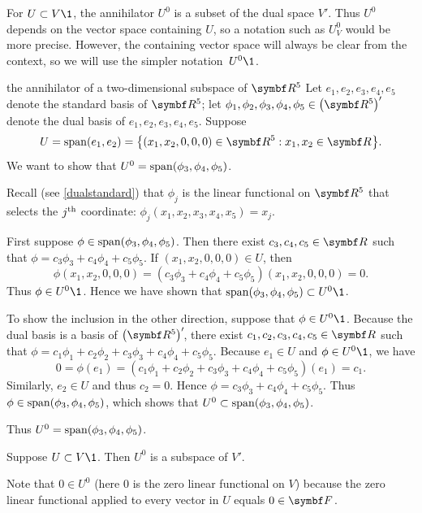 For $U \subset V\1$, the annihilator $U^0$ is a subset of the dual space $V'\!$. Thus $U^0$ depends on the vector space containing $U$, so a notation such as $U^0_V$ would be more precise. However, the containing vector space will always be clear from the context, so we will use the simpler notation~$U^0\1$.

\begin{example}[annih]{the annihilator of a two-dimensional subspace of\/ $\R5$}
Let $e_1, e_2, e_3, e_4, e_5$ denote the standard basis of $\R5$; let $\phi_1, \phi_2, \phi_3, \phi_4,\phi_5 \in {\paren[\big]{\R5}}'\!$ denote the dual basis of $e_1, e_2, e_3, e_4, e_5$. Suppose
\[
U = \Span(e_1, e_2) = \br[\big]{(x_1, x_2, 0, 0, 0) \in \R5: x_1, x_2 \in \R{}}.
\]
We want to show that $U^0 = \operatorname{span}(\phi_3, \phi_4, \phi_5)$.

Recall (see \ref{dualstandard}) that $\phi_j$ is the linear functional on $\R5$ that selects the $j^{\text{{th}}}$ coordinate: $\phi_j(x_1, x_2, x_3, x_4, x_5) = x_j$.

First suppose $\phi \in \operatorname{span}(\phi_3, \phi_4, \phi_5)$. Then there exist $c_3, c_4, c_5 \in \R{}$ such that $\phi = c_3 \phi_3 + c_4 \phi_4 + c_5 \phi_5$. If $(x_1, x_2, 0, 0, 0) \in U$, then
\[
\phi(x_1, x_2, 0, 0, 0) = (c_3 \phi_3 + c_4 \phi_4 + c_5 \phi_5)(x_1, x_2, 0, 0, 0) = 0.
\]
Thus $\phi \in U^0\1$. Hence we have shown that $\Span(\phi_3, \phi_4, \phi_5) \subset U^0\1$.

To show the inclusion in the other direction, suppose that $\phi \in U^0\1$. Because the dual basis is a basis of ${\paren[\big]{\R5}}'\!$, there exist $c_1, c_2, c_3, c_4, c_5 \in \R{}$ such that \mbox{$\phi = c_1 \phi_1 + c_2 \phi_2 + c_3 \phi_3 + c_4 \phi_4 + c_5 \phi_5$}. Because $e_1 \in U$ and $\phi \in U^0\1$, we have
\[
0 = \phi(e_1) = (c_1 \phi_1 + c_2 \phi_2 + c_3 \phi_3 + c_4 \phi_4 + c_5 \phi_5)(e_1) = c_1.
\]
Similarly, $e_2 \in U$ and thus $c_2 = 0$. Hence $\phi = c_3 \phi_3 + c_4 \phi_4 + c_5 \phi_5$. Thus $\phi \in \operatorname{span}(\phi_3, \phi_4, \phi_5)$, which shows that $U^0 \subset \operatorname{span}(\phi_3, \phi_4, \phi_5)$.

Thus $U^0 = \operatorname{span}(\phi_3, \phi_4, \phi_5)$.
\end{example}

{Suppose $U \subset V\1$. Then $U^0$ is a subspace of $V'\!$.}

\proof
Note that $0 \in U^0$ (here $0$ is the zero linear functional on $V$) because the zero linear functional applied to every vector in $U$ equals $0 \in \F{}$.

